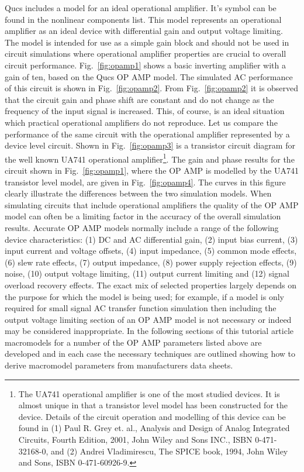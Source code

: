 Qucs includes a model for an ideal operational amplifier. It's symbol can be found in the nonlinear components list. This model represents an operational amplifier as an ideal device with differential gain and output voltage limiting. The model is intended for use as a simple gain block and should not be used in circuit simulations where operational amplifier properties are crucial to overall circuit performance. Fig.~\ref{fig:opamp1} shows a basic inverting amplifier with a gain of ten, based on the Qucs OP AMP model. The simulated AC performance of this circuit is shown in Fig.~\ref{fig:opamp2}.  From Fig.~\ref{fig:opamp2} it is observed that the circuit gain and phase shift are constant and do not change as the frequency of the input signal is increased. This, of course, is an ideal situation which practical operational amplifiers do not reproduce.  Let us compare the performance of the same circuit with the operational amplifier represented by a device level circuit. Shown in Fig.~\ref{fig:opamp3} is a transistor circuit diagram for the well known UA741 operational amplifier\footnote{The UA741 operational amplifier is one of the most studied devices. It is almost unique in that a transistor level model has been constructed for the device. Details of the circuit operation and modelling of this device can be found in (1) Paul R. Grey et. al., Analysis and Design of Analog Integrated Circuits, Fourth Edition, 2001, John Wiley and Sons INC., ISBN 0-471-32168-0, and (2) Andrei Vladimirescu, The SPICE book, 1994, John Wiley and Sons, ISBN 0-471-60926-9.}. The gain and phase results for the circuit shown in Fig.~\ref{fig:opamp1}, where the OP AMP is modelled by the UA741 transistor level model, are given in Fig.~\ref{fig:opamp4}.  The curves in this figure clearly illustrate the differences between the two simulation models.  When simulating circuits that include operational amplifiers the quality of the OP AMP model can often be a limiting factor in the accuracy of the overall simulation results.  Accurate OP AMP models normally include a range of the following device characteristics: (1) DC and AC differential gain, (2) input bias current, (3) input current and voltage offsets, (4) input impedance, (5) common mode effects, (6) slew rate effects, (7) output impedance, (8) power supply rejection effects, (9) noise, (10) output voltage limiting, (11) output  current limiting and (12) signal overload recovery effects. The exact mix of selected properties largely depends on the purpose for which the model is being used; for example, if a model is only required for small signal AC transfer function simulation then including the output voltage limiting section of an OP AMP model is not necessary or indeed may be considered inappropriate. In the following sections of this tutorial article macromodels for a number of the OP AMP parameters listed above are developed and in each case the necessary techniques are outlined showing how to derive macromodel parameters from manufacturers data sheets.


